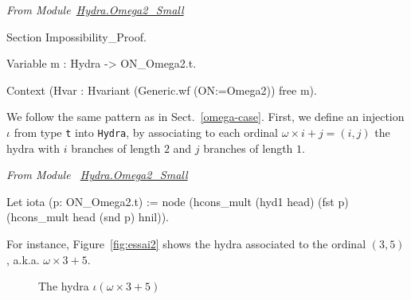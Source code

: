 \vspace{4pt}
\emph{From Module~\href{../theories/html/hydras.Hydra.Omega2_Small.html}{Hydra.Omega2\_Small}}


\begin{Coqsrc}
Section Impossibility_Proof.
  
 Variable m : Hydra -> ON_Omega2.t.
  
 Context (Hvar : Hvariant (Generic.wf (ON:=Omega2))  free m).
\end{Coqsrc}


We  follow the same pattern as in Sect.~\ref{omega-case}.
First, we define an injection $\iota$ from type \texttt{t} into \texttt{Hydra}, by
 associating to  each ordinal $\omega\times i+ j = (i,j)$ the hydra with $i$ branches of length $2$ and
$j$ branches of length $1$.


\vspace{4pt}
\emph{From Module ~\href{../theories/html/hydras.Hydra.Omega2_Small.html\#iota}{Hydra.Omega2\_Small}}

\begin{Coqsrc}
 Let iota (p: ON_Omega2.t) := 
     node (hcons_mult (hyd1 head) (fst p)
                    (hcons_mult head (snd p) hnil)).
\end{Coqsrc}

For instance, Figure~\vref{fig:essai2} shows the hydra associated to the ordinal 
$(3,5)$, a.k.a. $\omega\times 3 + 5$.

\begin{figure}[htb]
\centering
{}
\caption{\label{fig:essai2}
The hydra $\iota(\omega\times 3+5)$}
\end{figure}




